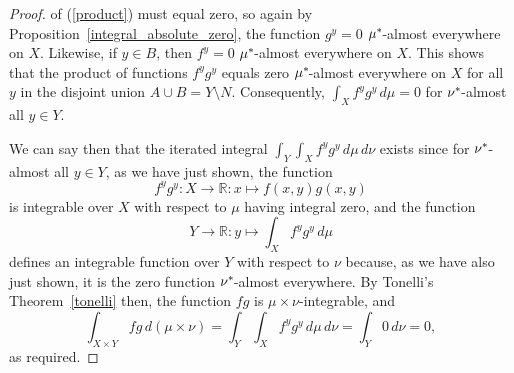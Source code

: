 \documentclass[
twoside=true,
paper=letter,
fontsize=11pt,
pagesize=auto,
leqno,
openany,
headsepline,
overfullrule,
]{scrbook}
\theoremstyle{plain}
\theoremstyle{plain}
\theoremstyle{definition}
\theoremstyle{bfnoteitalic}
\theoremstyle{bfnoteroman}
\newcommand{\R}{\mathbb{R}}
\newcommand{\kernast}{\ast\kern-1pt}
\newcommand{\function}{f}
\newcommand{\functionii}{g}
\newcommand{\measurespace}{X}
\newcommand{\measurespaceii}{Y}
\newcommand{\mspaceelt}{x}
\newcommand{\mspaceeltii}{y}
\newcommand{\measure}{\mu}
\newcommand{\measureii}{\nu}
\newcommand{\seti}{A}
\newcommand{\setii}{B}
\begin{document}
\begin{proof}
of (\ref{product}) must equal zero, so
again by Proposition~\ref{integral_absolute_zero}, the function 
$\functionii^\mspaceeltii = 0$ $\measure^\kernast$\hyp{}almost everywhere on $\measurespace$. 
Likewise, if
$\mspaceeltii\in\setii$, 
then 
$\function^\mspaceeltii = 0$ $\measure^\kernast$\hyp{}almost everywhere on $\measurespace$.
This shows that the product of functions
$\function^\mspaceeltii \functionii^\mspaceeltii$ equals zero  
$\measure^\kernast$\hyp{}almost everywhere on $\measurespace$
for all $\mspaceeltii$ in the disjoint union 
$\seti\cup\setii = \measurespaceii\setminus N$.
Consequently, 
$\int_\measurespace\function^\mspaceeltii \functionii^\mspaceeltii
\,d\measure = 0$ for $\measureii^\kernast$\hyp{}almost all $\mspaceeltii\in\measurespaceii$.

We can say then 
that the iterated integral
$\int_\measurespaceii \int_\measurespace 
\function^\mspaceeltii \functionii^\mspaceeltii
\,d\measure\, d\measureii$ exists
since for
$\measureii^\kernast$-almost all 
$\mspaceeltii\in\measurespaceii$, as we have just shown, the function
\[
\function^\mspaceeltii \functionii^\mspaceeltii:\measurespace \to \R 
:\mspaceelt\mapsto\function(\mspaceelt,\mspaceeltii)\functionii(\mspaceelt,\mspaceeltii)
\]
is integrable over $\measurespace$ with respect to $\measure$ having integral zero, and the function
\[ 
\measurespaceii\to\R:
\mspaceeltii\mapsto 
\int_\measurespace \function^\mspaceeltii\functionii^\mspaceeltii\, d\measure 
\]
defines an integrable function over $\measurespaceii$ with respect to $\measureii$ because, as we have also just shown, it is the zero function $\measureii^\kernast$\hyp{}almost everywhere. 
By Tonelli's Theorem~\ref{tonelli} then, the function $\function\functionii$ is $\measure\times\measureii$\hyp{}integrable, and
\[
\int_{\measurespace\times\measurespaceii}\function\functionii\,d(\measure\times\measureii)
=
\int_\measurespaceii \int_\measurespace 
\function^\mspaceeltii \functionii^\mspaceeltii
\,d\measure\, d\measureii
=
\int_\measurespaceii 0 \, d\measureii
=
0,
\]
as required.
\end{proof}
\end{document}
